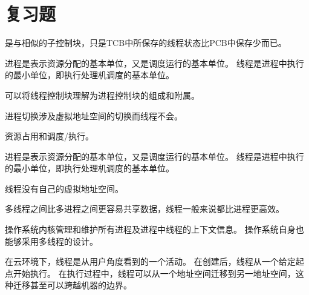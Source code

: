 
\section{复习题}
{
    \begin{reviewc}
        是与相似的子控制块，只是TCB中所保存的线程状态比PCB中保存少而已。

        进程是表示资源分配的基本单位，又是调度运行的基本单位。
        线程是进程中执行的最小单位，即执行处理机调度的基本单位。

        可以将线程控制块理解为进程控制块的组成和附属。
    \end{reviewc}

    \begin{reviewc}
        进程切换涉及虚拟地址空间的切换而线程不会。
    \end{reviewc}

    \begin{reviewc}
        资源占用和调度/执行。
    \end{reviewc}

    \begin{reviewc}

    \end{reviewc}

    \begin{reviewc}
        进程是表示资源分配的基本单位，又是调度运行的基本单位。
        线程是进程中执行的最小单位，即执行处理机调度的基本单位。

        线程没有自己的虚拟地址空间。
    \end{reviewc}

    \begin{reviewc}
        多线程之间比多进程之间更容易共享数据，线程一般来说都比进程更高效。
    \end{reviewc}

    \begin{reviewc}
        操作系统内核管理和维护所有进程及进程中线程的上下文信息。
        操作系统自身也能够采用多线程的设计。
    \end{reviewc}

    \begin{reviewc}
        在云环境下，线程是从用户角度看到的一个活动。
        在创建后，线程从一个给定起点开始执行。
        在执行过程中，线程可以从一个地址空间迁移到另一地址空间，这种迁移甚至可以跨越机器的边界。
    \end{reviewc}
}
